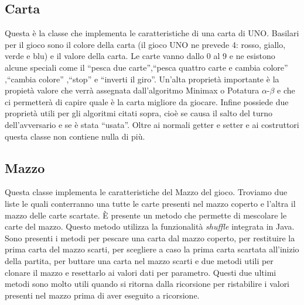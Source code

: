 	\subsection{Carta}
		Questa è la classe che implementa le caratteristiche di una carta di UNO. Basilari per il gioco sono il colore della carta (il gioco UNO ne prevede 4: rosso, giallo, verde e blu) e il valore della carta. Le carte vanno dallo 0 al 9 e ne esistono alcune speciali come il ``pesca due carte'',``pesca quattro carte e cambia colore'' ,``cambia colore'' ,``stop'' e ``inverti il giro''. Un'alta proprietà importante è la propietà valore che verrà assegnata dall'algoritmo Minimax o Potatura $\alpha$-$\beta$ e che ci permetterà di capire quale è la carta migliore da giocare. Infine possiede due proprietà utili per gli algoritmi citati sopra, cioè se causa il salto del turno dell'avversario e se è stata ``usata''. Oltre ai normali getter e setter e ai costruttori questa classe non contiene nulla di più.
		
	\subsection{Mazzo}
		Questa classe implementa le caratteristiche del Mazzo del gioco. Troviamo due liste le quali conterranno una tutte le carte presenti nel mazzo coperto e l'altra il mazzo delle carte scartate. È presente un metodo che permette di mescolare le carte del mazzo. Questo metodo utilizza la funzionalità \textit{shuffle} integrata in Java. Sono presenti i metodi per pescare una carta dal mazzo coperto, per restituire la prima carta del mazzo scarti, per scegliere a caso la prima carta scartata all'inizio della partita, per buttare una carta nel mazzo scarti e due metodi utili per clonare il mazzo e resettarlo ai valori dati per parametro. Questi due ultimi metodi sono molto utili quando si ritorna dalla ricorsione per ristabilire i valori presenti nel mazzo prima di aver eseguito a ricorsione.
		
